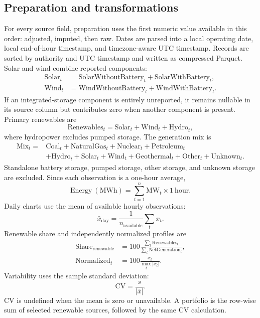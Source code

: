 \documentclass[11pt]{article}
\begin{document}
\subsection{Preparation and transformations}
For every source field, preparation uses the first numeric value available in this order: adjusted, imputed, then raw. Dates are parsed into a local operating date, local end-of-hour timestamp, and timezone-aware UTC timestamp. Records are sorted by authority and UTC timestamp and written as compressed Parquet. Solar and wind combine reported components:
\begin{align}
\mathrm{Solar}_t &= \mathrm{SolarWithoutBattery}_t+\mathrm{SolarWithBattery}_t,\\
\mathrm{Wind}_t &= \mathrm{WindWithoutBattery}_t+\mathrm{WindWithBattery}_t.
\end{align}
If an integrated-storage component is entirely unreported, it remains nullable in its source column but contributes zero when another component is present. Primary renewables are
\begin{equation}
\mathrm{Renewables}_t=\mathrm{Solar}_t+\mathrm{Wind}_t+\mathrm{Hydro}_t,
\end{equation}
where hydropower excludes pumped storage. The generation mix is
\begin{align}
\mathrm{Mix}_t={}&\mathrm{Coal}_t+\mathrm{NaturalGas}_t+\mathrm{Nuclear}_t+\mathrm{Petroleum}_t \nonumber\\
&+\mathrm{Hydro}_t+\mathrm{Solar}_t+\mathrm{Wind}_t+\mathrm{Geothermal}_t
+\mathrm{Other}_t+\mathrm{Unknown}_t.
\end{align}
Standalone battery storage, pumped storage, other storage, and unknown storage are excluded. Since each observation is a one-hour average,
\begin{equation}
\mathrm{Energy\ (MWh)}=\sum_{t=1}^{n}\mathrm{MW}_t\times 1\ \mathrm{hour}.
\end{equation}
Daily charts use the mean of available hourly observations:
\begin{equation}
\bar{x}_{\mathrm{day}}=\frac{1}{n_{\mathrm{available}}}\sum_t x_t.
\end{equation}
Renewable share and independently normalized profiles are
\begin{align}
\mathrm{Share}_{\mathrm{renewable}}&=100\frac{\sum_t\mathrm{Renewables}_t}{\sum_t\mathrm{NetGeneration}_t},\\
\mathrm{Normalized}_t&=100\frac{x_t}{\max_t|x_t|}.
\end{align}
Variability uses the sample standard deviation:
\begin{equation}
\mathrm{CV}=\frac{s}{|\bar{x}|}.
\end{equation}
CV is undefined when the mean is zero or unavailable. A portfolio is the row-wise sum of selected renewable sources, followed by the same CV calculation.
\end{document}
